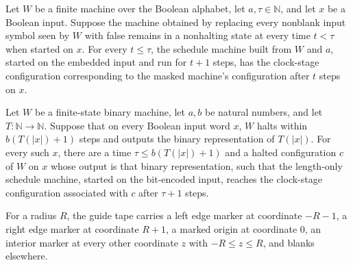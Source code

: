 \begin{lemma}
\label{Complexity.clockStageCfg_run}
\leanok
{}
Let $W$ be a finite machine over the Boolean alphabet, let $a,\tau\in\mathbb{N}$, and
let $x$ be a Boolean input. Suppose the machine obtained by replacing every nonblank
input symbol seen by $W$ with false remains in a nonhalting state at every time $t<\tau$
when started on $x$. For every $t\leq\tau$, the schedule machine built from $W$ and $a$,
started on the embedded input and run for $t+1$ steps, has the clock-stage configuration
corresponding to the masked machine's configuration after $t$ steps on $x$.
\end{lemma}

\begin{lemma}
\label{Complexity.clockStageCfg_captures}
\leanok
{}
Let $W$ be a finite-state binary machine, let $a,b$ be natural numbers, and let
$T:\mathbb{N}\to\mathbb{N}$. Suppose that on every Boolean input word $x$, $W$ halts
within $b(T(|x|)+1)$ steps and outputs the binary representation of $T(|x|)$. For every
such $x$, there are a time $\tau\le b(T(|x|)+1)$ and a halted configuration $c$ of $W$
on $x$ whose output is that binary representation, such that the length-only schedule
machine, started on the bit-encoded input, reaches the clock-stage configuration
associated with $c$ after $\tau+1$ steps.
\end{lemma}

\begin{definition}
\label{Complexity.guideTape}
\leanok
{}
For a radius $R$, the guide tape carries a left edge marker at coordinate $-R - 1$, a
right edge marker at coordinate $R + 1$, a marked origin at coordinate $0$, an
interior marker at every other coordinate $z$ with $-R \le z \le R$, and blanks
elsewhere.
\end{definition}

